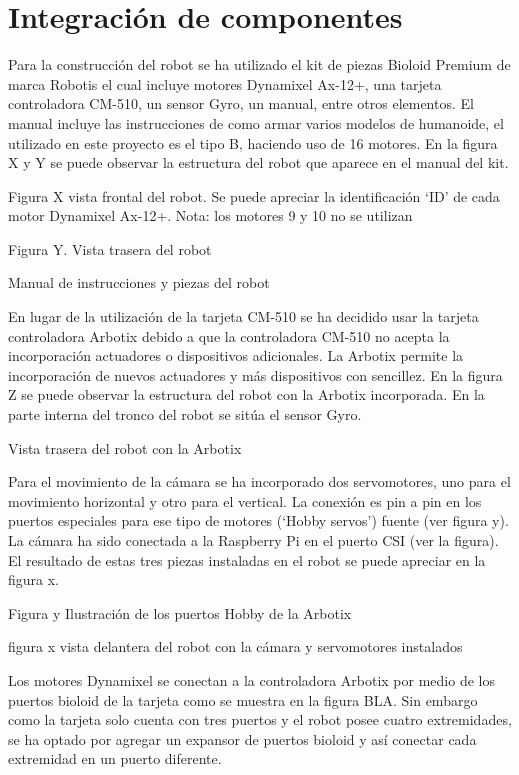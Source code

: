 \chapter{Integración de componentes}\label{chapter:def_lenguaje}

Para la construcción del robot se ha utilizado el kit de piezas Bioloid Premium de marca Robotis el cual incluye motores Dynamixel Ax-12+, una tarjeta controladora CM-510, un sensor Gyro, un manual, entre otros elementos. El manual incluye las instrucciones de como armar varios modelos de humanoide, el utilizado en este proyecto es el tipo B, haciendo uso de 16 motores. En la figura X y Y se puede observar la estructura del robot que aparece en el manual del kit. 


Figura X vista frontal del robot. Se puede apreciar la identificación ‘ID’ de cada motor Dynamixel Ax-12+. Nota: los motores 9 y 10 no se utilizan

Figura Y. Vista trasera del robot


Manual de instrucciones y piezas del robot 

En lugar de la utilización de la tarjeta CM-510 se ha decidido usar la tarjeta controladora Arbotix debido a que la controladora CM-510 no acepta la incorporación actuadores o dispositivos adicionales. La Arbotix permite la incorporación de nuevos actuadores y más dispositivos con sencillez. En la figura Z se puede observar la estructura del robot con la Arbotix incorporada. En la parte interna del tronco del robot se sitúa el sensor Gyro.


Vista trasera del robot con la Arbotix

Para el movimiento de la cámara se ha incorporado dos servomotores, uno para el movimiento horizontal y otro para el vertical. La conexión es pin a pin en los puertos especiales para ese tipo de motores (‘Hobby servos’) fuente (ver figura y). La cámara ha sido conectada a la Raspberry Pi en el puerto CSI (ver la figura). El resultado de estas tres piezas instaladas en el robot se puede apreciar en la figura x.


  
Figura y
Ilustración de los puertos Hobby de la Arbotix


figura x
vista delantera del robot con la cámara y servomotores instalados

 
Los motores Dynamixel se conectan a la controladora Arbotix por medio de los puertos bioloid de la tarjeta como se muestra en la figura BLA. Sin embargo como la tarjeta solo cuenta con tres puertos y el robot posee cuatro extremidades, se ha optado por agregar un expansor de puertos bioloid y así conectar cada extremidad en un puerto diferente. 

